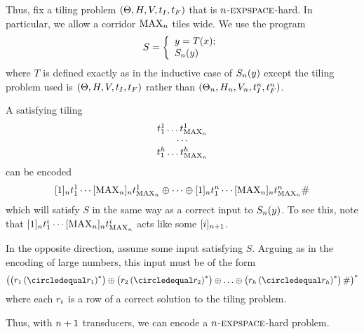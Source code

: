 Thus, fix a tiling problem
$\tup{\tiles, \hrel, \vrel, \inittile, \fintile}$
that is $\expheight$-$\expspace$-hard.
In particular, we allow a corridor $\nmax{\expheight}$ tiles wide.
We use the program
\[
    S = \left\{
        \begin{array}{l}
            y = \ap{T}{x}; \\
            \goodnums{\expheight}{y}
        \end{array}
    \right.
\]
where $T$ is defined exactly as in the inductive case of
$\goodnums{\expheight}{y}$
except the tiling problem used is
$\tup{\tiles, \hrel, \vrel, \inittile, \fintile}$
rather than
$\tup{\tilesnum{\expheight},
      \hrelnum{\expheight},
      \vrelnum{\expheight},
      \inittilenum{\expheight},
      \fintilenum{\expheight}}$.

A satisfying tiling
\[
    \begin{array}{c}
        \tile^1_1 \ldots \tile^1_{\nmax{\expheight}} \\
        \cdots \\
        \tile^\tileheight_1 \ldots \tile^\tileheight_{\nmax{\expheight}}
    \end{array}
\]
can be encoded
\[
    \tenc{\expheight}{1} \tile^1_1
    \cdots
    \tenc{\expheight}{\nmax{\expheight}} \tile^1_{\nmax{\expheight}}
    \numplus
    \cdots
    \numplus
    \tenc{\expheight}{1} \tile^\expheight_1
    \cdots
    \tenc{\expheight}{\nmax{\expheight}} \tile^\expheight_{\nmax{\expheight}}
    \numsep
\]
which will satisfy $S$ in the same way as a correct input to
$\goodnums{\expheight}{y}$.
To see this, note that
$\tenc{\expheight}{1} \tile^i_1
 \cdots
 \tenc{\expheight}{\nmax{\expheight}} \tile^i_{\nmax{\expheight}}$
acts like some
$\tenc{\expheight+1}{i}$.

In the opposite direction, assume some input satisfying $S$.
Arguing as in the encoding of large numbers, this input must be of the form
\[
    \brac{
        \brac{\tilerow_1 \brac{\numeq \tilerow_1}^\ast}
        \numplus
        \brac{\tilerow_2 \brac{\numeq \tilerow_2}^\ast}
        \numplus
        \ldots
        \numplus
        \brac{
            \tilerow_\tileheight
            \brac{\numeq \tilerow_\tileheight}^\ast
        }
        \numsep
    }^\ast
\]
where each $\tilerow_i$ is a row of a correct solution to the tiling problem.

Thus, with $\expheight+1$ transducers, we can encode a $\expheight$-$\expspace$-hard problem.
